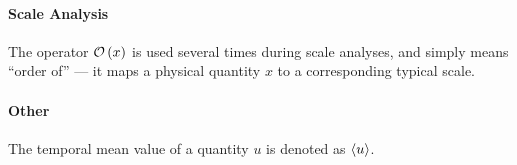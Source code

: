 \paragraph{Scale Analysis}
\begin{items}
	\item The operator \(\mathcal{O}\left(x\right)\) is used several times during scale analyses, and simply means \enquote{order of} --- it maps a physical quantity \(x\) to a corresponding typical scale.
\end{items}

\paragraph{Other}
\begin{items}
	\item The temporal mean value of a quantity \(u\) is denoted as \(\langle u \rangle\).
\end{items}
